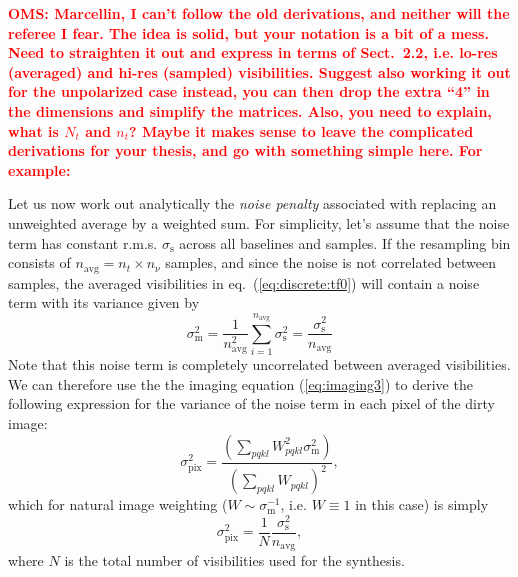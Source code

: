 \documentclass[useAMS,usenatbib]{mn2e}
\newcommand{\OMS}[1]{\textcolor{red}{{\bf OMS: #1}}}
\begin{document}
\OMS{Marcellin, I can't follow the old derivations, and neither will the referee I fear. 
The idea is solid, but your notation is a bit of a mess. Need to straighten it out
and express in terms of Sect.~2.2, i.e. lo-res (averaged) and hi-res (sampled) visibilities. 
Suggest also working it out for the unpolarized case instead, you can then drop the 
extra ``4'' in the dimensions and simplify the matrices. Also, you need to explain, what is $N_t$ and $n_t$? 
Maybe it makes sense to leave the complicated derivations for your thesis, and go with something simple here. 
For example:}

Let us now work out analytically the \emph{noise penalty} associated with replacing an unweighted average by 
a weighted sum. For simplicity, let's assume that the noise term
has constant r.m.s. $\sigma_\mathrm{s}$ across all baselines and samples. If the resampling bin 
consists of $n_\mathrm{avg} = n_t\times n_\nu$ samples, and since the noise is not correlated between samples, 
the averaged visibilities in eq.~(\ref{eq:discrete:tf0}) will contain a noise term with its variance given by
\begin{equation}
\sigma_\mathrm{m}^2 = \frac{1}{n_\mathrm{avg}^2} \sum_{i=1}^{n_\mathrm{avg}} \sigma_\mathrm{s}^2  = \frac{\sigma_\mathrm{s}^2}{n_\mathrm{avg}}
\end{equation}
Note that this noise term is completely uncorrelated between averaged visibilities. We can therefore use the
the imaging equation (\ref{eq:imaging3}) to derive the following expression for the variance of the noise 
term in each pixel of the dirty image:
\begin{equation}
\label{eq:noise:image}
\sigma_\mathrm{pix}^2 = \frac{ (\sum_{pqkl} W_{pqkl}^2 \sigma_\mathrm{m}^2) }{ (\sum_{pqkl} W_{pqkl})^2 },
\end{equation}
which for natural image weighting ($W\sim\sigma^{-1}_\mathrm{m}$, i.e. $W\equiv1$ in this case) is simply
\begin{equation}
\sigma_\mathrm{pix}^2 = \frac{1}{N}\frac{\sigma_\mathrm{s}^2}{n_\mathrm{avg}},
\end{equation}
where $N$ is the total number of visibilities used for the synthesis.
\end{document}
